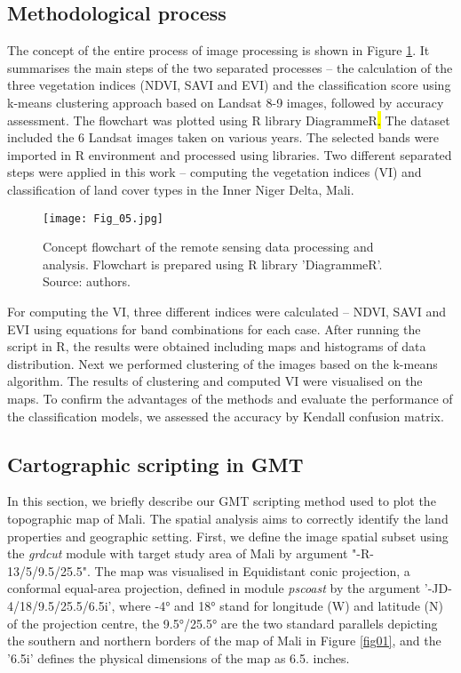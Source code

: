 \documentclass[12pt,a4paper,oneside]{article}
\def \newpar{\vspace{6pt}}
\begin{document}
\subsection*{Methodological process}

The concept of the entire process of image processing is shown in Figure \ref{fig05}. It summarises the main steps of the two separated processes -- the calculation of the three vegetation indices (NDVI, SAVI and EVI) and the classification score using k-means clustering approach based on Landsat 8-9 images, followed by accuracy assessment. The flowchart was plotted using R library DiagrammeR\hl{. }The dataset included the 6 Landsat images taken on various years. The selected bands were imported in R environment and processed using libraries. Two different separated steps were applied in this work -- computing the vegetation indices (VI) and classification of land cover types in the Inner Niger Delta, Mali.

\begin{figure}[H]
\centering
	\texttt{[image: Fig\_05.jpg]}
	\vspace*{20pt}\caption{Concept flowchart of the remote sensing data processing and analysis. Flowchart is prepared using R library 'DiagrammeR'. Source: authors.
	\label{fig05}}
\end{figure}

\newpar For computing the VI, three different indices were calculated -- NDVI, SAVI and EVI using equations for band combinations for each case. After running the script in R, the results were obtained including maps and histograms of data distribution. Next we performed clustering of the images based on the k-means algorithm. The results of clustering and computed VI were visualised on the maps. To confirm the advantages of the methods and evaluate the performance of the classification models, we assessed the accuracy by Kendall confusion matrix.

\subsection*{Cartographic scripting in GMT}

\newpar In this section, we briefly describe our GMT scripting method used to plot the topographic map of Mali. The spatial analysis aims to correctly identify the land properties and geographic setting. First, we define the image spatial subset using the \emph{grdcut} module with target study area of Mali by argument "-R-13/5/9.5/25.5". The map was visualised in Equidistant conic projection, a conformal equal-area projection, defined in module \emph{pscoast} by the argument '-JD-4/18/9.5/25.5/6.5i', where -4° and 18° stand for longitude (W) and latitude (N) of the projection centre, the 9.5°/25.5° are the two standard parallels depicting the southern and northern borders of the map of Mali in Figure \ref{fig01}, and the '6.5i' defines the physical dimensions of the map as 6.5. inches. 
\end{document}

